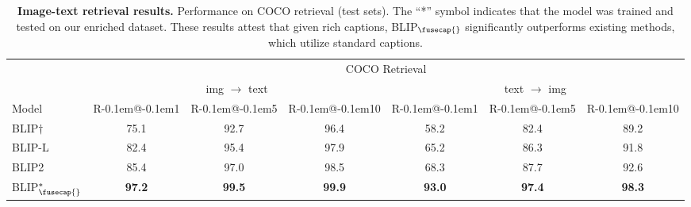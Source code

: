 \begin{table}
  \centering
\begin{tabular}{l *{3}{c@{\hspace{5pt}}} | *{3}{c@{\hspace{5pt}}}}
    \toprule
    & \multicolumn{6}{c}{COCO Retrieval} \\
    & \multicolumn{3}{c}{img $\rightarrow$ text} & \multicolumn{3}{c}{text $\rightarrow$ img} \\
    \cmidrule(lr){2-4} \cmidrule(lr){5-7}
    Model & 
    R\kern-0.1em@\kern-0.1em1 & R\kern-0.1em@\kern-0.1em5 & R\kern-0.1em@\kern-0.1em10 & R\kern-0.1em@\kern-0.1em1 & R\kern-0.1em@\kern-0.1em5 & R\kern-0.1em@\kern-0.1em10 \\
    \midrule
    BLIP$\dag$ & 75.1 & 92.7 & 96.4 & 58.2 & 82.4 & 89.2 \\
    BLIP-L & 82.4 & 95.4 & 97.9 & 65.2 & 86.3 & 91.8 \\
    BLIP2 & 85.4 & 97.0 & 98.5 & 68.3 & 87.7 & 92.6 \\
    \midrule
    BLIP$^*_\fusecap{}$ & \textbf{97.2} & \textbf{99.5} & \textbf{99.9} & \textbf{93.0} & \textbf{97.4} & \textbf{98.3} \\
    \bottomrule
\end{tabular}
\vspace{7pt}
  \caption{\textbf{Image-text retrieval results.} Performance on COCO retrieval (test sets). The ``*'' symbol indicates that the model was trained and tested on our enriched dataset. These results attest that given rich captions, BLIP$_\fusecap{}$ significantly outperforms existing methods, which utilize standard captions.
}
  \label{coco_retrieval}
  \vspace{-0.3cm}
\end{table}





